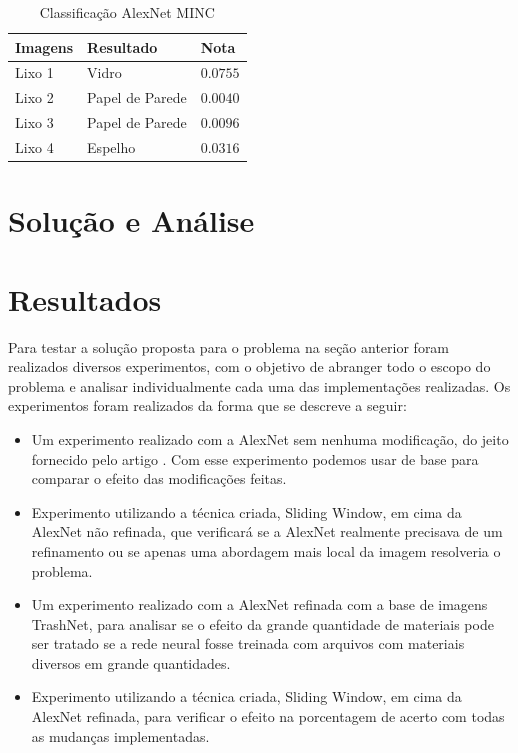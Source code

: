 \documentclass[conference, compsoc, 12pt]{IEEEtran}
\begin{document}
\begin{table}[]
\centering
\caption{Classificação AlexNet MINC}
\label{Tabela 1}
\begin{tabular}{|l|l|l|}
\hline
Imagens & Resultado & Nota \\ \hline
Lixo 1 & Vidro & $0.0755$ \\ \hline
Lixo 2 & Papel de Parede & $0.0040$ \\ \hline
Lixo 3 & Papel de Parede & $0.0096$\\ \hline
Lixo 4 & Espelho & $0.0316$ \\ \hline
\end{tabular}
\end{table}

\section{Solução e Análise}

\section{Resultados}

Para testar a solução proposta para o problema na seção anterior foram realizados diversos experimentos, com o objetivo de abranger todo o escopo do problema e analisar individualmente cada uma das implementações realizadas. Os experimentos foram realizados da forma que se descreve a seguir:

\begin{itemize}
    \item Um experimento realizado com a AlexNet sem nenhuma modificação, do jeito fornecido pelo artigo \cite{Artigo principal}. Com esse experimento podemos usar de base para comparar o efeito das modificações feitas.
    \item Experimento utilizando a técnica criada, Sliding Window, em cima da AlexNet não refinada, que verificará se a AlexNet realmente precisava de um refinamento ou se apenas uma abordagem mais local da imagem resolveria o problema.
    \item Um experimento realizado com a AlexNet refinada com a base de imagens TrashNet, para analisar se o efeito da grande quantidade de materiais pode ser tratado se a rede neural fosse treinada com arquivos com materiais diversos em grande quantidades.
    \item Experimento utilizando a técnica criada, Sliding Window, em cima da AlexNet refinada, para verificar o efeito na porcentagem de acerto com todas as mudanças implementadas.
\end{itemize}
\end{document}
